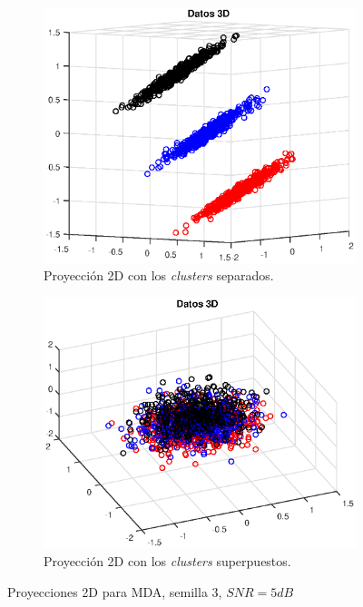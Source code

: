 \documentclass[11pt]{article} %
\begin{document}
\begin{figure}[h]
	\centering
	\begin{subfigure}[b]{0.435\textwidth}
		\includegraphics[width=\textwidth]{../21_seleccion/51_mda_5dB_separadas.eps}
		\caption[]{\small Proyección 2D con los \emph{clusters} separados.}
		\label{fig:5dB:mda_proj:separated}
	\end{subfigure}
	\quad
	\begin{subfigure}[b]{0.435\textwidth}
		\includegraphics[width=\textwidth]{../21_seleccion/51_mda_5dB_superpuestas.eps}
		\caption[]{\small Proyección 2D con los \emph{clusters} superpuestos.}
		\label{fig:5dB:mda_proj:overlapped}
	\end{subfigure}
	\caption{Proyecciones 2D para MDA, semilla 3, $SNR=5dB$}
	\label{fig:5dB:mda_proj}
\end{figure}
\end{document}
